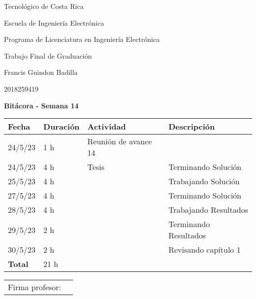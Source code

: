 \documentclass[12pt,oneside]{book}
\begin{document}
 \graphicspath{{./}{../tesis/fig/}}
  Tecnológico de Costa Rica
  \par\vspace{1mm}
  Escuela de Ingeniería Electrónica
  \par\vspace{1mm}
  Programa de Licenciatura en Ingeniería Electrónica
  \par\vspace{10mm}
  Trabajo Final de Graduación
  \par\vspace{1mm}
  Francis Guindon Badilla
  \par\vspace{1mm}
  2018259419
  \par\vspace{10mm}
  \large\textbf{Bitácora - Semana 14}
  \par\vspace{10mm}
  \small

  \begin{table} [!h]
    \centering
    \small
    \begin{tabular}{p{1.5 cm} p{2.1 cm} p{5 cm} p{8 cm}}
      \hline
      Fecha & Duración & Actividad & Descripción \\
      \hline
      24/5/23 & 1 h & Reunión de avance 14 & \\
      24/5/23 & 4 h & Tesis & Terminando Solución \\
      25/5/23 & 4 h & & Trabajando Solución \\
      27/5/23 & 4 h & & Terminando Solución \\
      28/5/23 & 4 h & & Trabajando Resultados \\
      29/5/23 & 2 h & & Terminando Resultados \\
      30/5/23 & 2 h & & Revisando capítulo 1 \\
      \hline
      \textbf{Total} & 21 h \\
      \hline
    \end{tabular}
  \end{table}
  
  \vfill

  \begin{tabular}{p{3 cm} p{10 cm}}
    Firma profesor: & \\
    \cline{2-2}
  \end{tabular}

  \newpage
\end{document}
